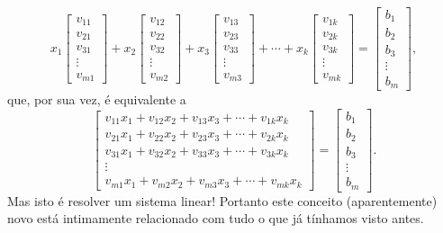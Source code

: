 \begin{equation}
x_1 \left[
  \begin{array}{c}
    v_{11} \\
    v_{21} \\
    v_{31} \\
    \vdots \\
    v_{m1}
  \end{array}
\right] + x_2
\left[
  \begin{array}{c}
    v_{12} \\
    v_{22} \\
    v_{32} \\
    \vdots \\
    v_{m2}
  \end{array}
\right] + x_3
\left[
  \begin{array}{c}
    v_{13} \\
    v_{23} \\
    v_{33} \\
    \vdots \\
    v_{m3}
  \end{array}
\right] + \cdots + x_k
\left[
  \begin{array}{c}
    v_{1k} \\
    v_{2k} \\
    v_{3k} \\
    \vdots \\
    v_{mk}
  \end{array}
\right] =
\left[
  \begin{array}{c}
    b_{1} \\
    b_{2} \\
    b_{3} \\
    \vdots \\
    b_{m}
  \end{array}
\right],
\end{equation} que, por sua vez, é equivalente a
\begin{equation}
\left[
  \begin{array}{c}
   v_{11} x_1 + v_{12} x_2 + v_{13} x_3 + \cdots + v_{1k} x_k  \\
   v_{21} x_1 + v_{22} x_2 + v_{23} x_3 + \cdots + v_{2k} x_k  \\
   v_{31} x_1 + v_{32} x_2 + v_{33} x_3 + \cdots + v_{3k} x_k  \\
   \vdots  \\
   v_{m1} x_1 + v_{m2} x_2 + v_{m3} x_3 + \cdots + v_{mk} x_k
  \end{array}
\right] =
\left[
  \begin{array}{c}
    b_{1} \\
    b_{2} \\
    b_{3} \\
    \vdots \\
    b_{m}
  \end{array}
\right].
\end{equation} Mas isto é resolver um sistema linear! Portanto este conceito (aparentemente) novo está intimamente relacionado com tudo o que já tínhamos visto antes.


